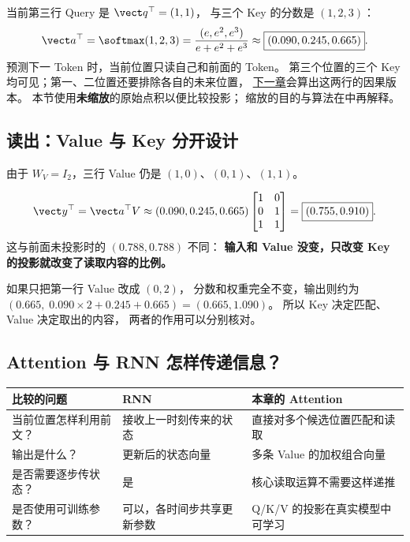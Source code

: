 当前第三行 Query 是 $\vect q^\top=(1,1)$，
与三个 Key 的分数是 $(1,2,3)$：
\[
\vect a^\top=\softmax(1,2,3)
=\frac{(e,e^2,e^3)}{e+e^2+e^3}
\approx\boxed{(0.090,0.245,0.665)}.
\]
预测下一 Token 时，当前位置只读自己和前面的 Token。
第三个位置的三个 Key 均可见；第一、二位置还要排除各自的未来位置，
\hyperref[concept:causal-mask]{下一章}会算出这两行的因果版本。
本节使用\textbf{未缩放}的原始点积以便比较投影；
缩放的目的与算法在中再解释。

\subsection{读出：Value 与 Key 分开设计}

由于 $W_V=I_2$，三行 Value 仍是
$(1,0)$、$(0,1)$、$(1,1)$。
\begin{example}
\[
\vect y^\top=\vect a^\top V
\approx(0.090,0.245,0.665)
\begin{bmatrix}1&0\\0&1\\1&1\end{bmatrix}
=\boxed{(0.755,0.910)}.
\]
这与前面未投影时的 $(0.788,0.788)$ 不同：
\textbf{输入和 Value 没变，只改变 Key 的投影就改变了读取内容的比例。}
\end{example}

如果只把第一行 Value 改成 $(0,2)$，
分数和权重完全不变，输出则约为
$(0.665,\;0.090\times2+0.245+0.665)=(0.665,1.090)$。
所以 Key 决定匹配、Value 决定取出的内容，
两者的作用可以分别核对。



\subsection{Attention 与 RNN 怎样传递信息？}

\begin{center}
\small
\renewcommand{\arraystretch}{1.35}
\begin{tabularx}{\linewidth}{@{}p{33mm}XX@{}}
\toprule
比较的问题 & RNN & 本章的 Attention\\
\midrule
当前位置怎样利用前文？ & 接收上一时刻传来的状态 & 直接对多个候选位置匹配和读取\\
输出是什么？ & 更新后的状态向量 & 多条 Value 的加权组合向量\\
是否需要逐步传状态？ & 是 & 核心读取运算不需要这样递推\\
是否使用可训练参数？ & 可以，各时间步共享更新参数 & Q/K/V 的投影在真实模型中可学习\\
\bottomrule
\end{tabularx}
\end{center}

